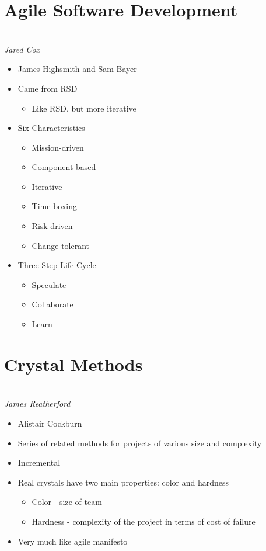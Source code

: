 \documentclass{report}
\begin{document}
		\section{Agile Software Development}\\
			\textit{Jared Cox}
			\begin{itemize}
				\item James Highsmith and Sam Bayer
				\item Came from RSD
					\begin{itemize}
						\item Like RSD, but more iterative
					\end{itemize}
				\item Six Characteristics
					\begin{itemize}
						\item Mission-driven
						\item Component-based
						\item Iterative
						\item Time-boxing
						\item Risk-driven
						\item Change-tolerant
					\end{itemize}
				\item Three Step Life Cycle
					\begin{itemize}
						\item Speculate
						\item Collaborate
						\item Learn
					\end{itemize}
			\end{itemize}
		\section{Crystal Methods}\\
			\textit{James Reatherford}
			\begin{itemize}
				\item Alistair Cockburn
				\item Series of related methods for projects of various size and complexity
				\item Incremental
				\item Real crystals have two main properties: color and hardness
				\begin{itemize}
					\item Color - size of team
					\item Hardness - complexity of the project in terms of cost of failure
				\end{itemize}
				\item Very much like agile manifesto
			\end{itemize}
\end{document}
